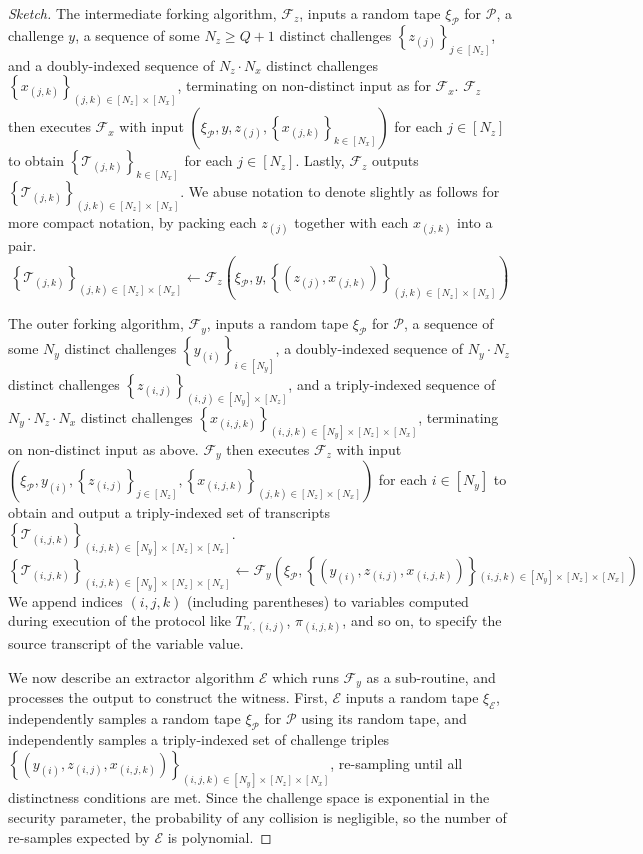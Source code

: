 \documentclass{article}
\theoremstyle{definition}
\begin{document}
\begin{proof}[Sketch]
The intermediate forking algorithm, $\mathcal{F}_z$, inputs a random tape $\xi_{\mathcal{P}}$ for $\mathcal{P}$, a challenge $y$, a sequence of some $N_z \geq Q+1$ distinct challenges $\left\{z_{(j)}\right\}_{j \in [N_z]}$, and a doubly-indexed sequence of $N_z \cdot N_x$ distinct challenges $\left\{x_{(j,k)}\right\}_{(j,k) \in [N_z] \times [N_x]}$, terminating on non-distinct input as for $\mathcal{F}_x$.  $\mathcal{F}_z$ then executes $\mathcal{F}_x$ with input $\left(\xi_{\mathcal{P}}, y, z_{(j)}, \left\{x_{(j,k)}\right\}_{k \in [N_x]}\right)$ for each $j \in [N_z]$ to obtain $\left\{\mathcal{T}_{(j,k)}\right\}_{k \in [N_x]}$ for each $j \in [N_z]$. Lastly, $\mathcal{F}_z$ outputs $\left\{\mathcal{T}_{(j,k)}\right\}_{(j,k) \in [N_z] \times [N_x]}$. We abuse notation to denote slightly as follows for more compact notation, by packing each $z_{(j)}$ together with each $x_{(j,k)}$ into a pair.
$$\left\{\mathcal{T}_{(j,k)}\right\}_{(j,k) \in [N_z] \times [N_x]} \leftarrow \mathcal{F}_z\left(\xi_{\mathcal{P}}, y, \left\{(z_{(j)}, x_{(j,k)})\right\}_{(j,k) \in [N_z] \times [N_x]}\right)$$

The outer forking algorithm, $\mathcal{F}_y$, inputs a random tape $\xi_{\mathcal{P}}$ for $\mathcal{P}$, a sequence of some $N_y$ distinct challenges $\left\{y_{(i)}\right\}_{i \in [N_y]}$, a doubly-indexed sequence of $N_y \cdot N_z$ distinct challenges $\left\{z_{(i,j)}\right\}_{(i,j) \in [N_y] \times [N_z]}$, and a triply-indexed sequence of $N_y \cdot N_z \cdot N_x$ distinct challenges $\left\{x_{(i,j,k)}\right\}_{(i,j,k) \in [N_y] \times [N_z] \times [N_x]}$, terminating on non-distinct input as above. $\mathcal{F}_y$ then executes $\mathcal{F}_z$ with input $\left(\xi_{\mathcal{P}}, y_{(i)}, \left\{z_{(i,j)}\right\}_{j \in [N_z]}, \left\{x_{(i,j,k)}\right\}_{(j,k) \in [N_z] \times [N_x]}\right)$ for each $i \in [N_y]$ to obtain and output a triply-indexed set of transcripts $\left\{\mathcal{T}_{(i,j,k)}\right\}_{(i,j,k) \in [N_y] \times [N_z] \times [N_x]}$. 
$$\left\{\mathcal{T}_{(i,j,k)}\right\}_{(i,j,k) \in [N_y] \times [N_z] \times [N_x]} \leftarrow \mathcal{F}_y\!\left(\!\xi_{\mathcal{P}},\! \left\{\!(y_{(i)},z_{(i,j)},x_{(i,j,k)})\!\right\}\!_{(i,j,k)\!\in\![N_y]\!\times\![N_z]\!\times\! [N_x]}\right)$$ We append indices $(i,j,k)$ (including parentheses) to variables computed during execution of the protocol like $T_{n^\prime, (i,j)}$, $\pi_{(i,j,k)}$, and so on, to specify the source transcript of the variable value.

We now describe an extractor algorithm $\mathcal{E}$ which runs $\mathcal{F}_y$ as a sub-routine, and processes the output to construct the witness. First, $\mathcal{E}$ inputs a random tape $\xi_{\mathcal{E}}$, independently samples a random tape $\xi_{\mathcal{P}}$ for $\mathcal{P}$ using its random tape, and independently samples a triply-indexed set of challenge triples $\left\{(y_{(i)}, z_{(i,j)}, x_{(i,j,k)})\right\}_{(i,j,k) \in [N_y] \times [N_z] \times [N_x]}$, re-sampling until all distinctness conditions are met. Since the challenge space is exponential in the security parameter, the probability of any collision is negligible, so the number of re-samples expected by $\mathcal{E}$ is polynomial.


\end{proof}
\end{document}
